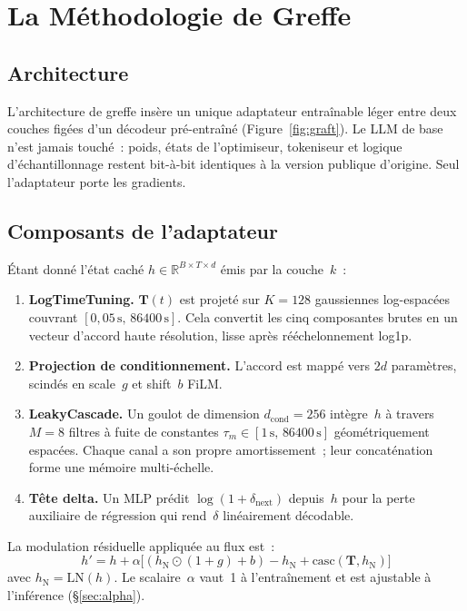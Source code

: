 \documentclass[10pt,twocolumn,letterpaper]{article}
\begin{document}
\section{La Méthodologie de Greffe}

\subsection{Architecture}

L'architecture de greffe insère un unique adaptateur entraînable léger entre deux couches figées d'un décodeur pré-entraîné (Figure~\ref{fig:graft}). Le LLM de base n'est jamais touché~: poids, états de l'optimiseur, tokeniseur et logique d'échantillonnage restent bit-à-bit identiques à la version publique d'origine. Seul l'adaptateur porte les gradients.

\subsection{Composants de l'adaptateur}

Étant donné l'état caché $h \in \mathbb{R}^{B\times T\times d}$ émis par la couche~$k$~:
\begin{enumerate}[leftmargin=0.6cm, itemsep=1pt]
    \item \textbf{LogTimeTuning.} $\mathbf{T}(t)$ est projeté sur $K=128$ gaussiennes log-espacées couvrant $[0{,}05\,\text{s},\,86400\,\text{s}]$. Cela convertit les cinq composantes brutes en un vecteur d'accord haute résolution, lisse après rééchelonnement log1p.
    \item \textbf{Projection de conditionnement.} L'accord est mappé vers $2d$ paramètres, scindés en scale~$g$ et shift~$b$ FiLM.
    \item \textbf{LeakyCascade.} Un goulot de dimension $d_{\text{cond}}=256$ intègre~$h$ à travers $M=8$ filtres à fuite de constantes $\tau_m \in [1\,\text{s},\,86400\,\text{s}]$ géométriquement espacées. Chaque canal a son propre amortissement~; leur concaténation forme une mémoire multi-échelle.
    \item \textbf{Tête delta.} Un MLP prédit $\log(1+\delta_{\text{next}})$ depuis~$h$ pour la perte auxiliaire de régression qui rend~$\delta$ linéairement décodable.
\end{enumerate}

La modulation résiduelle appliquée au flux est~:
\begin{equation}
h' = h + \alpha \bigl[(h_{\text{N}}\!\odot\!(1\!+\!g) + b) - h_{\text{N}} + \text{casc}(\mathbf{T},h_{\text{N}})\bigr]
\label{eq:modulation}
\end{equation}
avec $h_{\text{N}} = \text{LN}(h)$. Le scalaire~$\alpha$ vaut~1 à l'entraînement et est ajustable à l'inférence (\S\ref{sec:alpha}).
\end{document}
